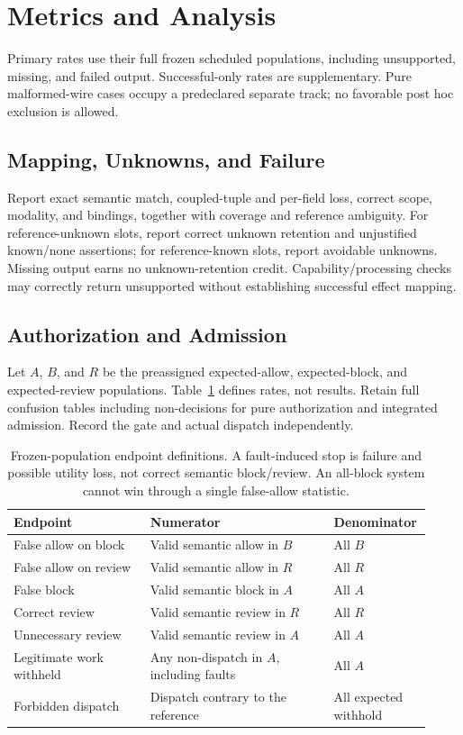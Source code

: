\documentclass[11pt,letterpaper]{article}
\begin{document}
\section{Metrics and Analysis}

Primary rates use their full frozen scheduled populations, including unsupported,
missing, and failed output. Successful-only rates are supplementary. Pure
malformed-wire cases occupy a predeclared separate track; no favorable post hoc
exclusion is allowed.

\subsection{Mapping, Unknowns, and Failure}
Report exact semantic match, coupled-tuple and per-field loss, correct scope,
modality, and bindings, together with coverage and reference ambiguity. For
reference-unknown slots, report correct unknown retention and unjustified
known/none assertions; for reference-known slots, report avoidable unknowns.
Missing output earns no unknown-retention credit. Capability/processing checks
may correctly return unsupported without establishing successful effect mapping.

\subsection{Authorization and Admission}
Let $A$, $B$, and $R$ be the preassigned expected-allow, expected-block, and
expected-review populations. Table~\ref{tab:metrics} defines rates, not results.
Retain full confusion tables including non-decisions for pure authorization
and integrated admission. Record the gate and actual dispatch independently.

\begin{table}[tbp]
\centering
\small
\begin{tabular}{@{}p{0.32\linewidth}p{0.43\linewidth}p{0.17\linewidth}@{}}
\hline
\textbf{Endpoint} & \textbf{Numerator} & \textbf{Denominator} \\
\hline
False allow on block & Valid semantic allow in $B$ & All $B$ \\
False allow on review & Valid semantic allow in $R$ & All $R$ \\
False block & Valid semantic block in $A$ & All $A$ \\
Correct review & Valid semantic review in $R$ & All $R$ \\
Unnecessary review & Valid semantic review in $A$ & All $A$ \\
Legitimate work withheld & Any non-dispatch in $A$, including faults & All $A$ \\
Forbidden dispatch & Dispatch contrary to the reference & All expected
withhold \\
\hline
\end{tabular}
\caption{Frozen-population endpoint definitions. A fault-induced stop is failure
and possible utility loss, not correct semantic block/review. An all-block
system cannot win through a single false-allow statistic.}
\label{tab:metrics}
\end{table}
\end{document}

